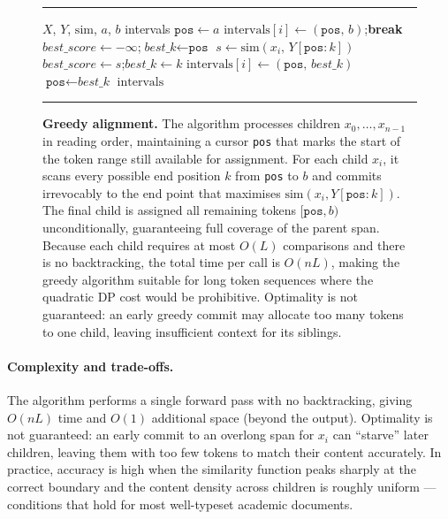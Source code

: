 \documentclass{article}
\theoremstyle{definition}
\begin{document}
\begin{figure}[h]
  \centering
  \hrule\vspace{4pt}
  \begin{minipage}{0.92\linewidth}
    \begin{algorithmic}[1]
      \Require $X$, $Y$, $\mathrm{sim}$, $a$, $b$
      \Ensure intervals
      \State $\texttt{pos} \gets a$
      \State $\mathrm{intervals}[i] \gets (\texttt{pos},\, b)$;\quad \textbf{break}
      \EndIf
      \State $\textit{best\_score} \gets -\infty$;\quad $\textit{best\_k} \gets \texttt{pos}$
      \State $s \gets \mathrm{sim}(x_i,\, Y[\texttt{pos}:k])$
      \State $\textit{best\_score} \gets s$;\quad $\textit{best\_k} \gets k$
      \EndIf
      \EndFor
      \State $\mathrm{intervals}[i] \gets (\texttt{pos},\, \textit{best\_k})$
      \State $\texttt{pos} \gets \textit{best\_k}$
      \EndFor
      \State \Return $\mathrm{intervals}$
    \end{algorithmic}
  \end{minipage}
  \vspace{4pt}\hrule
  \caption{%
  \textbf{Greedy alignment.}
  The algorithm processes children $x_0, \ldots, x_{n-1}$ in reading order,
  maintaining a cursor \texttt{pos} that marks the start of the token range
  still available for assignment.
  For each child $x_i$, it scans every possible end position $k$ from
  \texttt{pos} to $b$ and commits irrevocably to the end point that
  maximises $\mathrm{sim}(x_i, Y[\texttt{pos}:k])$.
  The final child is assigned all remaining tokens $[\texttt{pos}, b)$
  unconditionally, guaranteeing full coverage of the parent span.
  Because each child requires at most $O(L)$ comparisons and there is no
  backtracking, the total time per call is $O(nL)$, making the greedy
  algorithm suitable for long token sequences where the quadratic DP cost
  would be prohibitive.
  Optimality is not guaranteed: an early greedy commit may allocate too
  many tokens to one child, leaving insufficient context for its siblings.%
  }
  \label{alg:greedy}
\end{figure}

\paragraph{Complexity and trade-offs.}
The algorithm performs a single forward pass with no backtracking, giving
$O(nL)$ time and $O(1)$ additional space (beyond the output).  Optimality is
not guaranteed: an early commit to an overlong span for $x_i$ can
``starve'' later children, leaving them with too few tokens to match their
content accurately.  In practice, accuracy is high when the similarity
function peaks sharply at the correct boundary and the content density across
children is roughly uniform --- conditions that hold for most well-typeset
academic documents.
\end{document}
